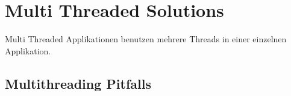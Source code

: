 \section{Multi Threaded Solutions}
\label{section: Multi Threaded Solutions}

Multi Threaded Applikationen benutzen mehrere Threads in einer einzelnen Applikation. \cite[p. 1]{DabMIT}


\subsection{Multithreading Pitfalls}
\label{subsection: multithreading pitfalls}

\cite[p. 2]{Sch97}